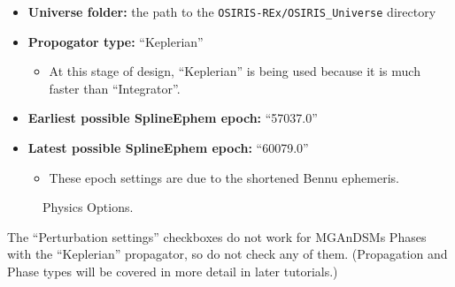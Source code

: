 \documentclass[11pt]{article}
\begin{document}
\begin{itemize}
	\item \textbf{Universe folder:} the path to the \texttt{OSIRIS-REx/OSIRIS\_Universe} directory
	\item \textbf{Propogator type:} ``Keplerian''
	\begin{itemize}
		\item At this stage of design, ``Keplerian'' is being used because it is much faster than ``Integrator''.
	\end{itemize}
	\item \textbf{Earliest possible SplineEphem epoch:} ``57037.0''
	\item \textbf{Latest possible SplineEphem epoch:} ``60079.0''
	\begin{itemize}
		\item These epoch settings are due to the shortened Bennu ephemeris.
	\end{itemize}
\end{itemize}

\begin{figure}[H]
	\centering
	\caption{\label{fig:physics_options}Physics Options.}
\end{figure}

\noindent The ``Perturbation settings'' checkboxes do not work for \ac{MGAnDSMs} Phases with the ``Keplerian'' propagator, so do not check any of them. (Propagation and Phase types will be covered in more detail in later tutorials.)
\end{document}
